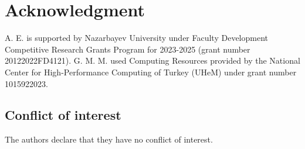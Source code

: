 \documentclass[10pt]{article}
\numberwithin{equation}{section}
\begin{document}
		
		\section*{Acknowledgment}
		
		A. E. is supported by Nazarbayev University under Faculty Development Competitive Research Grants Program for 2023-2025 (grant number 20122022FD4121). G. M. M.  used Computing Resources provided by the National Center for High-Performance Computing of Turkey (UHeM) under grant number 1015922023.
		
		\subsection*{Conflict of interest} The authors declare that they have no conflict of interest. 
		
\end{document}
